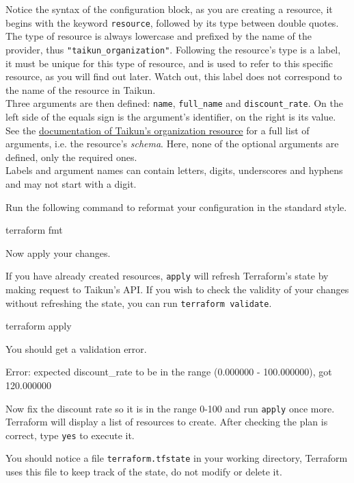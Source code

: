 \begin{tip}
Notice the syntax of the configuration block, as you are creating a resource,
it begins with the keyword \texttt{resource}, followed by its type between double quotes.
The type of resource is always lowercase and prefixed by the name of the provider,
thus \texttt{"taikun\_organization"}.
Following the resource's type is a label, it must be unique for this type of resource, and is used
to refer to this specific resource, as you will find out later.
Watch out, this label does not correspond to the name of the resource in Taikun.\\

Three arguments are then defined: \texttt{name}, \texttt{full\_name} and \texttt{discount\_rate}.
On the left side of the equals sign is the argument's identifier, on the right is its value.
See the \href{https://registry.terraform.io/providers/itera-io/taikun/latest/docs/resources/organization}{documentation of Taikun's organization resource} for a full list of arguments, i.e. the resource's \textit{schema}.
Here, none of the optional arguments are defined, only the required ones.\\

Labels and argument names can contain letters, digits, underscores and hyphens and may not start with a digit.
\end{tip}
Run the following command to reformat your configuration in the standard style.
\begin{shell}
terraform fmt
\end{shell}
Now apply your changes.
\begin{tip}
If you have already created resources, \texttt{apply} will refresh Terraform's state
by making request to Taikun's API. If you wish to check the validity of your changes
without refreshing the state, you can run \texttt{terraform validate}.
\end{tip}
\begin{shell}
terraform apply
\end{shell}
You should get a validation error.
\begin{raw}
Error: expected discount_rate to be in the range (0.000000 - 100.000000), got 120.000000
\end{raw}
Now fix the discount rate so it is in the range 0-100 and run \texttt{apply} once more.
Terraform will display a list of resources to create.
After checking the plan is correct, type \texttt{yes} to execute it.
\begin{tip}
You should notice a file \texttt{terraform.tfstate} in your working directory,
Terraform uses this file to keep track of the state, do not modify or delete it.
\end{tip}
